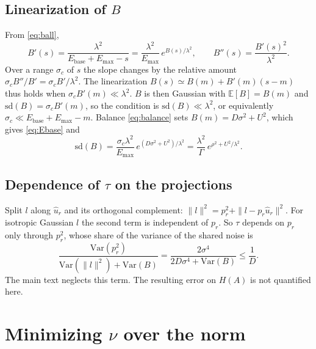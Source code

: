 \documentclass[11pt,a4paper]{article}
\newcommand{\EE}{\mathbb{E}}
\newcommand{\Var}{\mathrm{Var}}
\newcommand{\sd}{\mathrm{sd}}
\newcommand{\Ebase}{E_{\mathrm{base}}}
\newcommand{\Emax}{E_{\mathrm{max}}}
\newcommand{\uhat}{\hat{u}}
\begin{document}
\subsection{Linearization of \texorpdfstring{$B$}{B}}
\label{app:lin}

From \eqref{eq:ball},
\begin{equation*}
  B'(s)=\frac{\lambda^2}{\Ebase+\Emax-s}=\frac{\lambda^2}{\Emax}\,e^{B(s)/\lambda^2},
  \qquad
  B''(s)=\frac{B'(s)^2}{\lambda^2}.
\end{equation*}
Over a range $\sigma_c$ of $s$ the slope changes by the relative amount
$\sigma_c B''/B'=\sigma_c B'/\lambda^2$. The linearization
$B(s)\simeq B(m)+B'(m)(s-m)$ thus holds when $\sigma_c B'(m)\ll\lambda^2$. $B$ is then
Gaussian with $\EE[B]=B(m)$ and $\sd(B)=\sigma_c B'(m)$, so the condition is
$\sd(B)\ll\lambda^2$, or equivalently $\sigma_c\ll\Ebase+\Emax-m$. Balance
\eqref{eq:balance} sets $B(m)=D\sigma^2+U^2$, which gives \eqref{eq:Ebase} and
\begin{equation*}
  \sd(B)=\frac{\sigma_c\lambda^2}{\Emax}\,e^{(D\sigma^2+U^2)/\lambda^2}
  =\frac{\lambda^2}{\Gamma}\,e^{\rho^2+U^2/\lambda^2}.
\end{equation*}

\subsection{Dependence of \texorpdfstring{$\tau$}{tau} on the projections}
\label{app:indep}

Split $l$ along $\uhat_r$ and its orthogonal complement:
$\|l\|^2=p_r^2+\|l-p_r\uhat_r\|^2$. For isotropic Gaussian $l$ the second term is
independent of $p_r$. So $\tau$ depends on $p_r$ only through $p_r^2$, whose share of the
variance of the shared noise is
\begin{equation*}
  \frac{\Var(p_r^2)}{\Var(\|l\|^2)+\Var(B)}=\frac{2\sigma^4}{2D\sigma^4+\Var(B)}\le\frac1D .
\end{equation*}
The main text neglects this term. The resulting error on $H(A)$ is not quantified here.

\section{Minimizing \texorpdfstring{$\nu$}{nu} over the norm}
\label{app:lambert}
\end{document}
